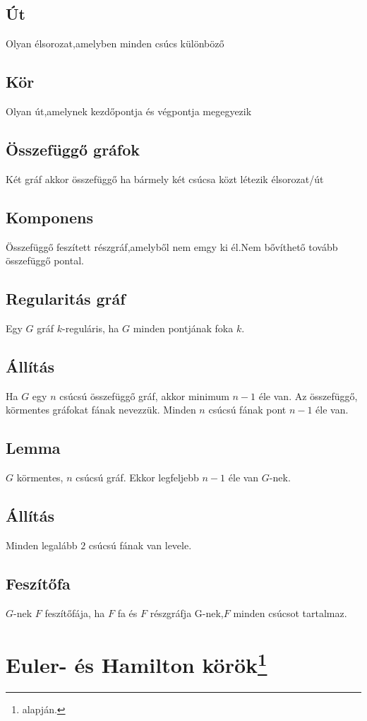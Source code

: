 \documentclass[12pt,a4paper,twoside]{report}
\begin{document}
\subsection{Út}
Olyan élsorozat,amelyben minden csúcs különböző
\subsection{Kör}
Olyan út,amelynek kezdőpontja és végpontja megegyezik
\subsection{Összefüggő gráfok}
Két gráf akkor összefüggő ha bármely két csúcsa közt létezik élsorozat/út
\subsection{Komponens}
Összefüggő feszített részgráf,amelyből nem emgy ki él.Nem bővíthető tovább összefüggő pontal.
\subsection{Regularitás gráf}
Egy $G$ gráf $k$-reguláris, ha $G$ minden pontjának foka $k$.
\subsection{Állítás}
Ha $G$ egy $n$ csúcsú összefüggő gráf, akkor minimum $n-1$ éle van.
\df
Az összefüggő, körmentes gráfokat fának nevezzük.
\al
Minden $n$ csúcsú fának pont $n-1$ éle van.
\subsection{Lemma}
$G$ körmentes, $n$ csúcsú gráf. Ekkor legfeljebb $n-1$ éle van $G$-nek.
\subsection{Állítás}
Minden legalább $2$ csúcsú fának van levele.
\subsection{Feszítőfa}
$G$-nek $F$ feszítőfája, ha $F$ fa és $F$ részgráfja G-nek,$F$ minden csúcsot tartalmaz.
\section{Euler- és Hamilton körök\protect\footnote{\cite{kv} alapján.}}
\end{document}
